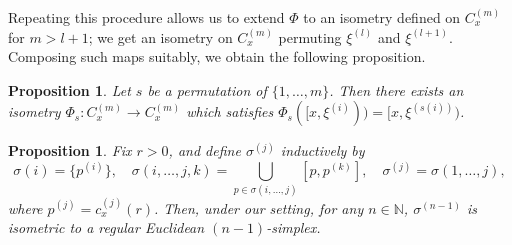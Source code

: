 \documentclass[12pt]{amsart}
\numberwithin{equation}{section}
\theoremstyle{plain}
\newtheorem{Proposition}[Theorem]{Proposition}
\theoremstyle{definition}
\theoremstyle{remark}
\newcommand{\N}{{\mathbb N}}
\newcommand{\p}[1]{p^{(#1)}}
\newcommand{\xxi}[1]{\xi^{(#1)}}
\newcommand{\ray}[1]{[#1)}
\newcommand{\cc}[2]{c_{#1}^{#2}}
\newcommand{\cone}[2][]{C_{#1}^{(#2)}}
\begin{document}
 Repeating this procedure allows us to extend $\Phi$ to an isometry
 defined on $\cone[x]{m}$ for $m>l+1$; we get an isometry on
 $\cone[x]{m}$ permuting $\xi^{(l)}$ and $\xxi{l+1}$.  
 Composing such maps suitably,  we obtain the following proposition.

\begin{Proposition}
\label{prop:phi_is_a_isometry}
 Let $s$ be a permutation of $\{1, \dots, m\}$. 
 Then there exists an isometry
 $\Phi_{s} \colon \cone[x]{m}\rightarrow \cone[x]{m}$ which
 satisfies $\Phi_{s}(\ray{x,\xxi{i}})=\ray{x,\xxi{s(i)}}$. 
\end{Proposition}


%
%
\begin{Proposition}
 \label{prop:simplex}
  Fix $r>0$, and 
  define $\sigma^{(j)}$ inductively by
\begin{equation*}
 \sigma(i)=\{\p{i}\}, \quad
 \sigma(i,\dots, j,k)=\bigcup_{p \in \sigma(i,\dots,j)}[p,p^{(k)}], 
 \quad   \sigma^{(j)}= \sigma(1, \dots, j), 
\end{equation*}
 where $\p{j}=\cc{x}{(j)}(r)$.
 Then, under our setting, for any $n \in \N$, $\sigma^{(n-1)}$ is
 isometric to a regular Euclidean $(n-1)$-simplex. 
\end{Proposition}
\end{document}
